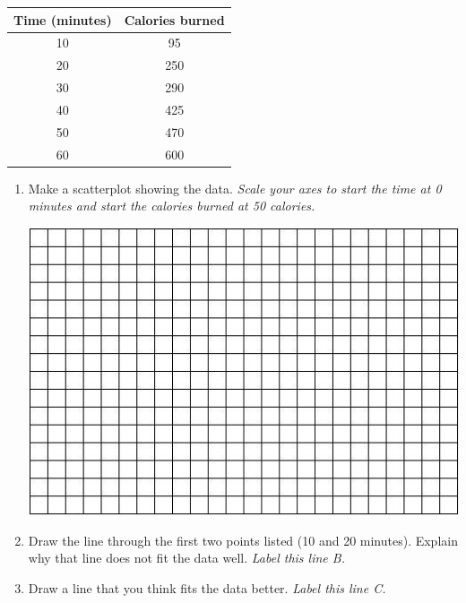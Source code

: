 \documentclass[12pt]{article}
\begin{document}
\begin{enumerate}
\begin{center}
\begin{tabular} { |  c | c |} \hline
Time (minutes) & Calories burned \\ \hline \hline
 10 & 95  \\ \hline
 20 & 250  \\ \hline
 30 & 290 \\ \hline
 40 & 425 \\  \hline
 50 & 470 \\ \hline
 60 & 600 \\ \hline
\end{tabular}
\end{center}

\begin{enumerate}
\item Make a scatterplot showing the data.  \emph{Scale your axes to start the time at 0 minutes and start the calories burned at 50 calories.}
\vfill
\begin{center}
 {\includegraphics [width = 6in] {../GraphPaper}}
\end{center}
\vfill

\item  Draw the line through the first two points listed (10 and 20 minutes).  Explain why that line does not fit the data well.  \emph{Label this line B.}
\vfill
\vfill
\vfill
\item  Draw a line that you think fits the data better.  \emph{Label this line C.}
\end{enumerate}


\end{enumerate}
\end{document}
